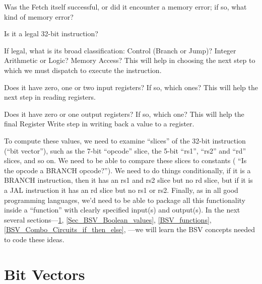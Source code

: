 \begin{tightlist}

 \item Was the Fetch itself successful, or did it encounter a memory
   error; if so, what kind of memory error?

 \item Is it a legal 32-bit instruction?

 \item If legal, what is its broad classification: Control (Branch or
   Jump)? Integer Arithmetic or Logic? Memory Access?  This will help
   in choosing the next step to which we must dispatch to execute the
   instruction.

 \item Does it have zero, one or two input registers?  If so, which
   ones?  This will help the next step in reading registers.

 \item Does it have zero or one output registers?  If so, which one?
   This will help the final Register Write step in writing back a
   value to a register.

\end{tightlist}

To compute these values, we need to examine ``slices'' of the 32-bit
instruction (``bit vector''), such as the 7-bit ``opcode'' slice, the
5-bit ``rs1'', ``rs2'' and ``rd'' slices, and so on.  We need to be
able to compare these slices to constants ({\eg} ``Is the opcode a
BRANCH opcode?'').  We need to do things conditionally, {\eg} if it is
a BRANCH instruction, then it has an rs1 and rs2 slice but no rd
slice, but if it is a JAL instruction it has an rd slice but no rs1 or
rs2.  Finally, as in all good programming languages, we'd need to be
able to package all this functionality inside a ``function'' with
clearly specified input(s) and output(s).  In the next several
sections---\ref{Sec_BSV_Bit_Vectors}, \ref{Sec_BSV_Boolean_values},
\ref{BSV_functions}, \ref{BSV_Combo_Circuits_if_then_else}, ---we will
learn the BSV concepts needed to code these ideas.


\section{Bit Vectors}

\label{Sec_BSV_Bit_Vectors}


